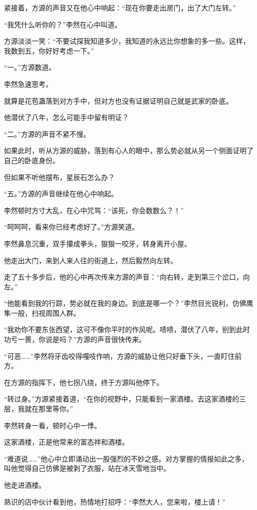 \begin{this_body}
紧接着，方源的声音又在他心中响起：“现在你要走出房门，出了大门左转。”

“我凭什么听你的？”李然在心中叫道。

方源淡淡一笑：“不要试探我知道多少，我知道的永远比你想象的多一些。这样，我数到五，你好好考虑一下。”

“一。”方源数道。

李然急速思考。

就算是花苞蛊落到对方手中，但对方也没有证据证明自己就是武家的卧底。

他潜伏了八年，怎么可能手中留有明证？

“二。”方源的声音不紧不慢。

如果此时，听从方源的威胁，落到有心人的眼中，那么势必就从另一个侧面证明了自己的卧底身份。

但如果不听他摆布，星辰石怎么办？

“五。”方源的声音继续在他心中响起。

李然顿时方寸大乱，在心中咒骂：“该死，你会数数么？！”

“呵呵呵，看来你已经考虑好了。”方源笑道。

李然鼻息沉重，双手攥成拳头，狠狠一咬牙，转身离开小屋。

他走出大门，来到人来人往的街道上，然后毅然向左转。

走了五十多步后，他的心中再次传来方源的声音：“向右转，走到第三个岔口，向左。”

“他能看到我的行踪，势必就在我的身边。到底是哪一个？”李然目光锐利，仿佛鹰隼一般，扫视周围人群。

“我劝你不要东张西望，这可不像你平时的作风呢。啧啧，潜伏了八年，别到此时功亏一篑，你说是吗？”方源的声音很快传来。

“可恶……”李然将牙齿咬得嘎吱作响，方源的威胁让他只好垂下头，一直盯住前方。

在方源的指挥下，他七拐八绕，终于方源叫他停下。

“转过身。”方源紧接着道，“在你的视野中，只能看到一家酒楼。去这家酒楼的三层，我就在那里等你。”

李然转身一看，顿时心中一悸。

这家酒楼，正是他常来的富态祥和酒楼。

“难道说……”他心中立即涌动出一股强烈的不妙之感。对方掌握的情报如此之多，叫他觉得自己仿佛是被剥了衣服，站在冰天雪地当中。

他走进酒楼。

熟识的店中伙计看到他，热情地打招呼：“李然大人，您来啦，楼上请！”


\end{this_body}
